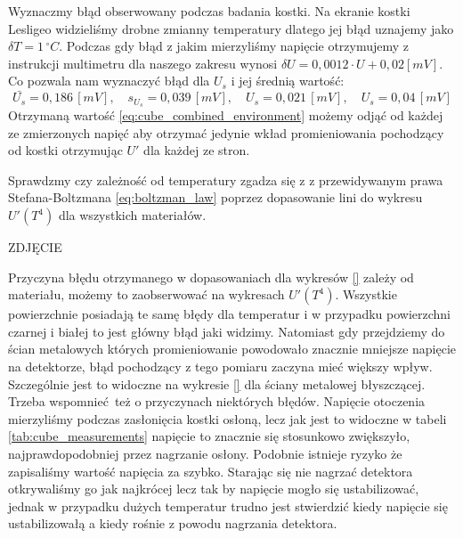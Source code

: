 \documentclass[12pt]{article}
\begin{document}
Wyznaczmy błąd obserwowany podczas badania kostki. Na ekranie kostki Lesligeo widzieliśmy drobne zmianny temperatury dlatego jej błąd uznajemy jako $\delta T = 1 \, ^{\circ}C$.
Podczas gdy błąd z jakim mierzyliśmy napięcie otrzymujemy z instrukcji multimetru \cite{radiation_multimeter} dla naszego zakresu wynosi $\delta U = 0{,}0012 \cdot U + 0{,}02 [mV]$.
Co pozwala nam wyznaczyć błąd dla $U_s$ i jej średnią wartość:
\begin{equation}
    \bar{U_s} = 0{,}186 \, [mV], \quad s_{U_s} = 0{,}039 \, [mV], \quad U_s = 0{,}021 \, [mV], \quad U_s = 0{,}04 \, [mV]
    \label{eq:cube_combined_environment}
\end{equation}
Otrzymaną wartość \eqref{eq:cube_combined_environment} możemy odjąć od każdej ze zmierzonych napięć aby otrzymać jedynie wkład promieniowania pochodzący od kostki otrzymując $U'$ dla każdej ze stron.

Sprawdzmy czy zależność od temperatury zgadza się z z przewidywanym prawa Stefana-Boltzmana \eqref{eq:boltzman_law} poprzez dopasowanie lini do wykresu $U'(T^4)$ dla wszystkich materiałów.

ZDJĘCIE

Przyczyna błędu otrzymanego w dopasowaniach dla wykresów \ref{} zależy od materiału, możemy to zaobserwować na wykresach $U'(T^4)$. Wszystkie powierzchnie posiadają te samę błędy dla temperatur i w przypadku powierzchni czarnej i białej to jest główny błąd jaki widzimy.
Natomiast gdy przejdziemy do ścian metalowych których promieniowanie powodowało znacznie mniejsze napięcie na detektorze, błąd pochodzący z tego pomiaru zaczyna mieć większy wpływ. Szczególnie jest to widoczne na wykresie \ref{} dla ściany metalowej błyszczącej.
Trzeba wspomnieć też o przyczynach niektórych błędów. Napięcie otoczenia mierzyliśmy podczas zasłonięcia kostki osłoną, lecz jak jest to widoczne w tabeli \ref{tab:cube_measurements} napięcie to znacznie się stosunkowo zwiększyło, najprawdopodobniej przez nagrzanie osłony.
Podobnie istnieje ryzyko że zapisaliśmy wartość napięcia za szybko. Starając się nie nagrzać detektora otkrywaliśmy go jak najkrócej lecz tak by napięcie mogło się ustabilizować, jednak w przypadku dużych temperatur trudno jest stwierdzić kiedy napięcie się ustabilizowałą a kiedy rośnie z powodu nagrzania detektora.
\end{document}
